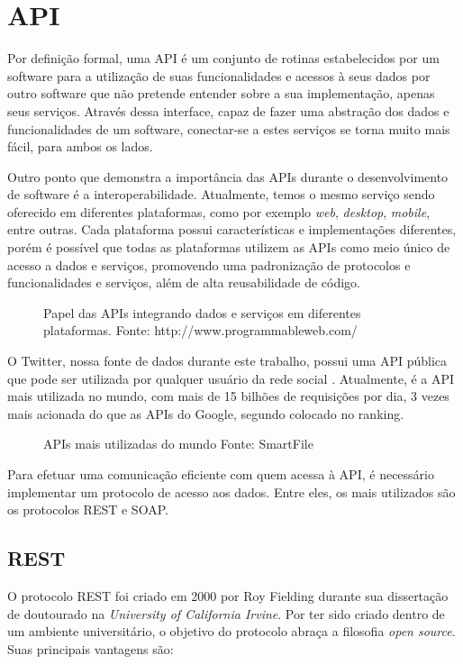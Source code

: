 \section{API}\label{sec:api}

Por definição formal, uma API é um conjunto de rotinas estabelecidos por um software para a utilização de suas funcionalidades e acessos à seus dados por outro software que não pretende entender sobre a sua implementação, apenas seus serviços. Através dessa interface, capaz de fazer uma abstração dos dados e funcionalidades de um software, conectar-se a estes serviços se torna muito mais fácil, para ambos os lados.

Outro ponto que demonstra a importância das APIs durante o desenvolvimento de software é a interoperabilidade. Atualmente, temos o mesmo serviço sendo oferecido em diferentes plataformas, como por exemplo \textit{web}, \textit{desktop}, \textit{mobile}, entre outras. Cada plataforma possui características e implementações diferentes, porém é possível que todas as plataformas utilizem as APIs como meio único de acesso a dados e serviços, promovendo uma padronização de protocolos e funcionalidades e serviços, além de alta reusabilidade de código.

\begin{figure}[!h]
	\centering{}
	\caption{Papel das APIs integrando dados e serviços em diferentes plataformas. Fonte: http://www.programmableweb.com/}
	\label{uni}
\end{figure}

O Twitter, nossa fonte de dados durante este trabalho, possui uma API pública que pode ser utilizada por qualquer usuário da rede social \cite{twitterapidocs}. Atualmente, é a API mais utilizada no mundo, com mais de 15 bilhões de requisições por dia, 3 vezes mais acionada do que as APIs do Google, segundo colocado no ranking.

\begin{figure}[!h]
	\centering{}
	\caption{APIs mais utilizadas do mundo Fonte: SmartFile}
	\label{uni}
\end{figure}

Para efetuar uma comunicação eficiente com quem acessa à API, é necessário implementar um protocolo de acesso aos dados. Entre eles, os mais utilizados são os protocolos REST e SOAP.

\subsection{REST}
O protocolo REST foi criado em 2000 por Roy Fielding \cite{fieldingrest} durante sua dissertação de doutourado na \textit{University of California Irvine}. Por ter sido criado dentro de um ambiente universitário, o objetivo do protocolo abraça a filosofia \textit{open source}. Suas principais vantagens são:

